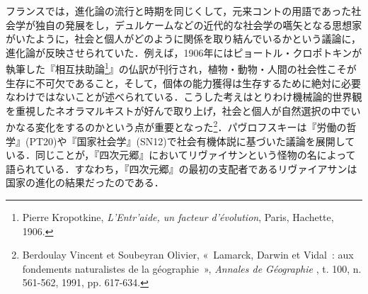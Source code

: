 フランスでは，進化論の流行と時期を同じくして，元来コントの用語であった社会学が独自の発展をし，デュルケームなどの近代的な社会学の嚆矢となる思想家がいたように，社会と個人がどのように関係を取り結んでいるかという議論に，進化論が反映させられていた．例えば，1906年にはピョートル・クロポトキンが執筆した『相互扶助論\footnote{Pierre Kropotkine, \emph{L'Entr'aide, un facteur d'évolution}, Paris, Hachette, 1906.}』の仏訳が刊行され，植物・動物・人間の社会性こそが生存に不可欠であること，そして，個体の能力獲得は生存するために絶対に必要なわけではないことが述べられている．こうした考えはとりわけ機械論的世界観を重視したネオラマルキストが好んで取り上げ，社会と個人が自然選択の中でいかなる変化をするのかという点が重要となった\footnote{Berdoulay Vincent et Soubeyran Olivier, «~Lamarck, Darwin et Vidal~: aux fondements naturalistes de la géographie~», \emph{Annales de Géographie} , t. 100, n. 561-562, 1991, pp. 617-634.}．パヴロフスキーは『労働の哲学』(PT20)や『国家社会学』(SN12)で社会有機体説に基づいた議論を展開している．同じことが，『四次元郷』においてリヴァイサンという怪物の名によって語られている．すなわち，『四次元郷』の最初の支配者であるリヴァイアサンは国家の進化の結果だったのである．

